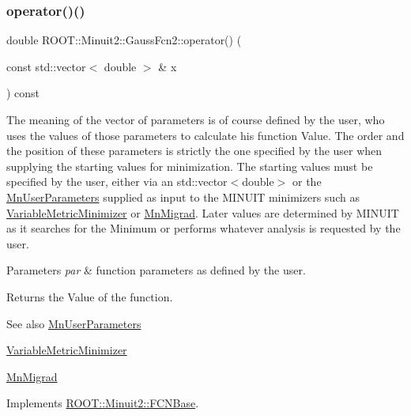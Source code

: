 \subsubsection{\texorpdfstring{operator()()}{operator()()}}
{\footnotesize\ttfamily double R\+O\+O\+T\+::\+Minuit2\+::\+Gauss\+Fcn2\+::operator() (\begin{DoxyParamCaption}\item[{const std\+::vector$<$ double $>$ \&}]{x }\end{DoxyParamCaption}) const\hspace{0.3cm}{\ttfamily [virtual]}}

The meaning of the vector of parameters is of course defined by the user, who uses the values of those parameters to calculate his function Value. The order and the position of these parameters is strictly the one specified by the user when supplying the starting values for minimization. The starting values must be specified by the user, either via an std\+::vector$<$double$>$ or the \mbox{\hyperlink{classROOT_1_1Minuit2_1_1MnUserParameters}{Mn\+User\+Parameters}} supplied as input to the M\+I\+N\+U\+IT minimizers such as \mbox{\hyperlink{classROOT_1_1Minuit2_1_1VariableMetricMinimizer}{Variable\+Metric\+Minimizer}} or \mbox{\hyperlink{classROOT_1_1Minuit2_1_1MnMigrad}{Mn\+Migrad}}. Later values are determined by M\+I\+N\+U\+IT as it searches for the Minimum or performs whatever analysis is requested by the user.


\begin{DoxyParams}{Parameters}
{\em par} & function parameters as defined by the user.\\
\hline
\end{DoxyParams}
\begin{DoxyReturn}{Returns}
the Value of the function.
\end{DoxyReturn}
\begin{DoxySeeAlso}{See also}
\mbox{\hyperlink{classROOT_1_1Minuit2_1_1MnUserParameters}{Mn\+User\+Parameters}} 

\mbox{\hyperlink{classROOT_1_1Minuit2_1_1VariableMetricMinimizer}{Variable\+Metric\+Minimizer}} 

\mbox{\hyperlink{classROOT_1_1Minuit2_1_1MnMigrad}{Mn\+Migrad}} 
\end{DoxySeeAlso}


Implements \mbox{\hyperlink{classROOT_1_1Minuit2_1_1FCNBase_ae4a86bd94d0d0f5ca6fc8f8ab2bb43cd}{R\+O\+O\+T\+::\+Minuit2\+::\+F\+C\+N\+Base}}.

\mbox{\label{classROOT_1_1Minuit2_1_1GaussFcn2_a11faaa08de303ea203403c320c9e1f0a}} 
